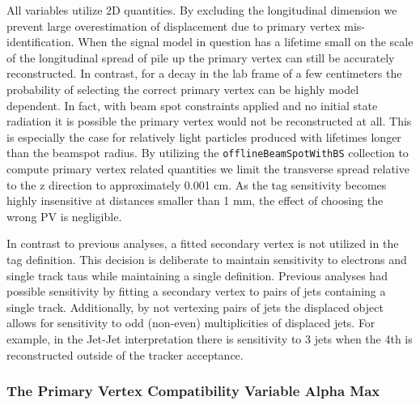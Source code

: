 All variables utilize 2D quantities. By excluding the longitudinal dimension we prevent large overestimation of displacement due to primary vertex mis-identification.
When the signal model in question has a lifetime small on the scale of the longitudinal spread of pile up the primary vertex can still be accurately reconstructed. 
In contrast, for a decay in the lab frame of a few centimeters the probability of selecting the correct primary vertex can be highly model dependent. In fact, with
beam spot constraints applied and no initial state radiation it is possible the primary vertex would not be reconstructed at all. This is especially the case for relatively light particles produced with lifetimes longer than the beamspot radius. By utilizing the \texttt{offlineBeamSpotWithBS} collection to compute primary vertex 
related quantities we limit the transverse spread relative to the z direction to approximately  0.001 cm. As the tag sensitivity becomes highly insensitive at distances smaller than 1 mm, the effect of choosing the wrong PV is negligible. 

In contrast to previous analyses, a fitted secondary vertex is not utilized in the tag definition. This decision is deliberate to maintain sensitivity to
electrons and single track taus while maintaining a single definition. Previous analyses had possible sensitivity by fitting a secondary vertex to pairs of jets containing a single track. Additionally, by not vertexing pairs of jets the displaced object allows for sensitivity to odd (non-even) multiplicities of displaced jets. For example, in the Jet-Jet interpretation there is sensitivity to 3 jets when the 4th is reconstructed outside of the tracker acceptance. 

\subsubsection{The Primary Vertex Compatibility Variable Alpha Max}

